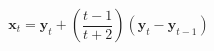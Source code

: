 \documentclass[border=2pt,varwidth]{standalone}
\begin{document}
\[
 \mathbf{x}_t = \mathbf{y}_t + \left( \frac{t-1}{t+2} \right)
  \left( \mathbf{y}_t - \mathbf{y}_{t-1} \right)
\]
\end{document}
